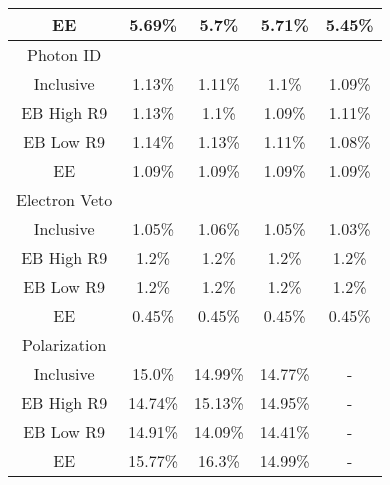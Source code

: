\begin{tabular}{c|c|c|c|c}
EE & 5.69\% & 5.7\% & 5.71\% & 5.45\% \\
\hline\hline
Photon ID  & \multicolumn{4}{l}{} \\ \hline
Inclusive & 1.13\% & 1.11\% & 1.1\% & 1.09\% \\
EB High R9 & 1.13\% & 1.1\% & 1.09\% & 1.11\% \\
EB Low R9 & 1.14\% & 1.13\% & 1.11\% & 1.08\% \\
EE & 1.09\% & 1.09\% & 1.09\% & 1.09\% \\
\hline\hline
Electron Veto  & \multicolumn{4}{l}{} \\ \hline
Inclusive & 1.05\% & 1.06\% & 1.05\% & 1.03\% \\
EB High R9 & 1.2\% & 1.2\% & 1.2\% & 1.2\% \\
EB Low R9 & 1.2\% & 1.2\% & 1.2\% & 1.2\% \\
EE & 0.45\% & 0.45\% & 0.45\% & 0.45\% \\
\hline\hline
Polarization  & \multicolumn{4}{l}{} \\ \hline
Inclusive & 15.0\% & 14.99\% & 14.77\% & - \\
EB High R9 & 14.74\% & 15.13\% & 14.95\% & - \\
EB Low R9 & 14.91\% & 14.09\% & 14.41\% & - \\
EE & 15.77\% & 16.3\% & 14.99\% & - \\
\hline\hline

\end{tabular}


